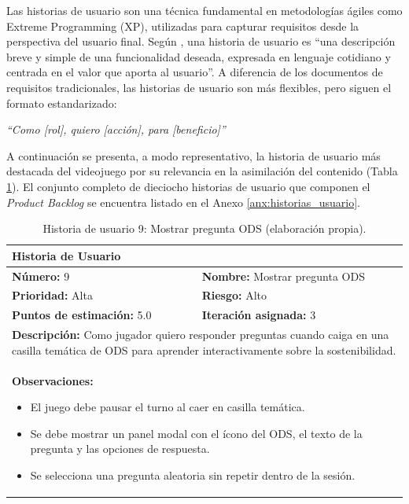 Las historias de usuario son una técnica fundamental en metodologías ágiles como Extreme Programming (XP), utilizadas para capturar requisitos desde la perspectiva del usuario final. Según \citeauthor{Cohn2005} \parencite{Cohn2005}, una historia de usuario es ``una descripción breve y simple de una funcionalidad deseada, expresada en lenguaje cotidiano y centrada en el valor que aporta al usuario''. A diferencia de los documentos de requisitos tradicionales, las historias de usuario son más flexibles, pero siguen el formato estandarizado:

\begin{center}
\textit{``Como [rol], quiero [acción], para [beneficio]''}
\end{center}

A continuación se presenta, a modo representativo, la historia de usuario más destacada del videojuego por su relevancia en la asimilación del contenido (Tabla \ref{tab:hu9}). El conjunto completo de dieciocho historias de usuario que componen el \textit{Product Backlog} se encuentra listado en el Anexo \ref{anx:historias_usuario}.

\begin{table}[H]
\centering
\caption{Historia de usuario 9: Mostrar pregunta ODS (elaboración propia).\label{tab:hu9}}
\renewcommand{\arraystretch}{1.5}
\begin{tabular}{|p{}|p{}|}
\hline
\multicolumn{2}{|l|}{\textbf{Historia de Usuario}} \\
\hline
\textbf{Número:} 9 & \textbf{Nombre:} Mostrar pregunta ODS \\
\hline
\textbf{Prioridad:} Alta & \textbf{Riesgo:} Alto \\
\hline
\textbf{Puntos de estimación:} 5.0 & \textbf{Iteración asignada:} 3 \\
\hline
\multicolumn{2}{|p{0.945\textwidth}|}{\textbf{Descripción:} Como jugador quiero responder preguntas cuando caiga en una casilla temática de ODS para aprender interactivamente sobre la sostenibilidad.} \\
\hline
\multicolumn{2}{|p{0.945\textwidth}|}{\textbf{Observaciones:}
\vspace{-0.5em}
\begin{itemize}
    \setlength\itemsep{0em}
    \item El juego debe pausar el turno al caer en casilla temática.
    \item Se debe mostrar un panel modal con el ícono del ODS, el texto de la pregunta y las opciones de respuesta.
    \item Se selecciona una pregunta aleatoria sin repetir dentro de la sesión.
\end{itemize}
\vspace{-1em}
} \\
\hline
\end{tabular}
\end{table}

